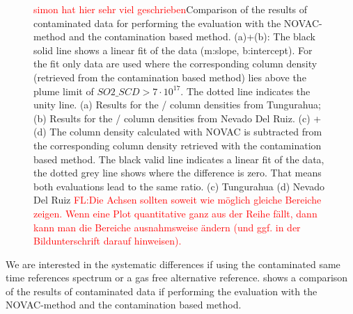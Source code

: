 \documentclass  [
  paper    = a4,
  BCOR     = 10mm,
  twoside,
  fontsize = 12pt,
  fleqn,
  toc      = bibnumbered,
  toc      = listofnumbered,
  numbers  = noendperiod,
  headings = normal,
  listof   = leveldown,
  version  = 3.03
]                                       {scrreprt}
\begin{document}
\begin{figure}[h!]
{		\label{fig:diffratioc}}
	\caption{\textcolor{red}{simon hat hier sehr viel geschrieben}Comparison of the results of contaminated data for performing the evaluation with the NOVAC-method and the contamination based method.  (a)+(b): The black solid line shows a linear fit of the data (m:slope, b:intercept). For the fit only data are used where the corresponding   column density (retrieved from the contamination based method) lies above the plume limit of $SO2\_SCD>7\cdot 10^{17}$. The dotted line indicates the unity line. (a) Results for the   /  column densities from Tungurahua; (b) Results for the   /  column densities from Nevado Del Ruiz. 
		(c) +(d) The column density calculated with NOVAC is subtracted from the corresponding column density retrieved with the contamination based method. The black valid line indicates a linear fit of the data, the dotted grey line shows where the difference is zero. That means both evaluations lead to the same ratio. (c) Tungurahua (d) Nevado Del Ruiz \textcolor{red}{FL:Die Achsen sollten soweit wie möglich gleiche Bereiche zeigen. Wenn eine Plot quantitative ganz aus der Reihe fällt, dann kann man die Bereiche ausnahmsweise ändern (und ggf. in der Bildunterschrift darauf hinweisen).}}
	\label{fig:diffratio}
\end{figure}
	We are interested in the systematic differences if using the contaminated same time references spectrum or a gas free alternative reference.  
	 shows a comparison of the results of contaminated data if performing the evaluation with the NOVAC-method and the contamination based method. 
\end{document}
